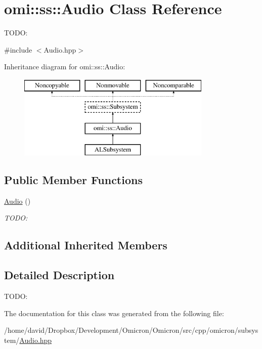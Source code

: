 \hypertarget{classomi_1_1ss_1_1_audio}{}\section{omi\+:\+:ss\+:\+:Audio Class Reference}
\label{classomi_1_1ss_1_1_audio}


T\+O\+DO\+:  




{\ttfamily \#include $<$Audio.\+hpp$>$}

Inheritance diagram for omi\+:\+:ss\+:\+:Audio\+:\begin{figure}[H]
\begin{center}
\leavevmode
\includegraphics[height=4.000000cm]{classomi_1_1ss_1_1_audio}
\end{center}
\end{figure}
\subsection*{Public Member Functions}
\begin{DoxyCompactItemize}
\item 
\hyperlink{classomi_1_1ss_1_1_audio_a2f2223a266cde9309ef2a309a14f9520}{Audio} ()\hypertarget{classomi_1_1ss_1_1_audio_a2f2223a266cde9309ef2a309a14f9520}{}\label{classomi_1_1ss_1_1_audio_a2f2223a266cde9309ef2a309a14f9520}

\begin{DoxyCompactList}\small\item\em T\+O\+DO\+: \end{DoxyCompactList}\end{DoxyCompactItemize}
\subsection*{Additional Inherited Members}


\subsection{Detailed Description}
T\+O\+DO\+: 

The documentation for this class was generated from the following file\+:\begin{DoxyCompactItemize}
\item 
/home/david/\+Dropbox/\+Development/\+Omicron/\+Omicron/src/cpp/omicron/subsystem/\hyperlink{_audio_8hpp}{Audio.\+hpp}\end{DoxyCompactItemize}
